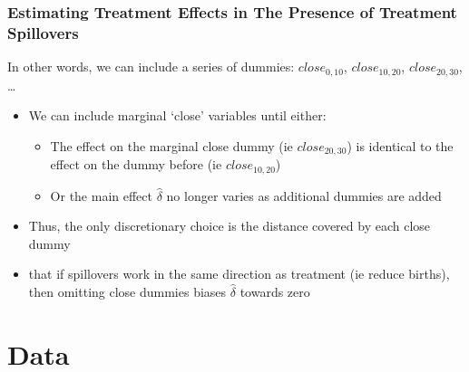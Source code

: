 \documentclass[10pt,letterpaper,subeqn]{beamer}
\begin{document}
\begin{frame}[label=demo1]
\frametitle{Estimating Treatment Effects in The Presence of Treatment Spillovers}
In other words, we can include a series of dummies: $close_{0,10}$, $close_{10,20}$, 
$close_{20,30}$, \ldots
\vspace{5mm}
\begin{itemize}
\item We can include marginal `close' variables until either:
\begin{itemize}
\item The effect on the marginal close dummy (ie $close_{20,30}$) is identical to the effect 
on the dummy before (ie $close_{10,20}$)
\item Or the main effect $\hat{\delta}$ no longer varies as additional dummies are added
\end{itemize}
\item Thus, the only discretionary choice is the distance covered by each close dummy
\item \hyperlink{demonstrate}{} that if spillovers work in 
the same direction as treatment (ie reduce births),
then omitting close dummies biases $\hat\delta$ towards zero
\end{itemize}
\end{frame}



\section{Data}
\end{document}
